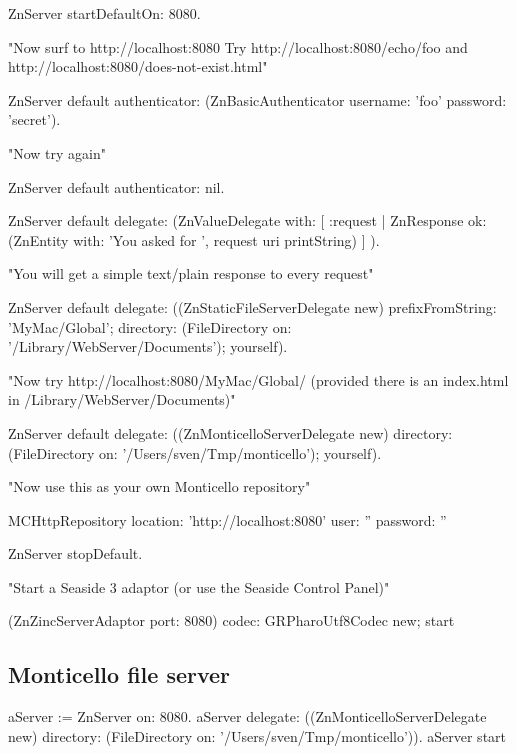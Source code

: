 \documentclass[a4paper,10pt,twoside]{book}
\begin{document}
\begin{code}{}
ZnServer startDefaultOn: 8080. 


"Now surf to http://localhost:8080
 Try http://localhost:8080/echo/foo and http://localhost:8080/does-not-exist.html"


ZnServer default authenticator: (ZnBasicAuthenticator username: 'foo' password: 'secret').


"Now try again"


ZnServer default authenticator: nil.

ZnServer default delegate: 
  (ZnValueDelegate with: [ :request | 
    ZnResponse ok: (ZnEntity with: 'You asked for ', request uri printString) ] ).


"You will get a simple text/plain response to every request"


ZnServer default delegate: ((ZnStaticFileServerDelegate new) 
                               prefixFromString: 'MyMac/Global'; 
                               directory: (FileDirectory on: '/Library/WebServer/Documents'); 
                               yourself).


"Now try http://localhost:8080/MyMac/Global/ 
 (provided there is an index.html in /Library/WebServer/Documents)"


ZnServer default delegate: ((ZnMonticelloServerDelegate new) 
                               directory: (FileDirectory on: '/Users/sven/Tmp/monticello'); 
                               yourself).


"Now use this as your own Monticello repository"


MCHttpRepository
  location: 'http://localhost:8080'
  user: ''
  password: ''

ZnServer stopDefault.


"Start a Seaside 3 adaptor (or use the Seaside Control Panel)"


(ZnZincServerAdaptor port: 8080)
  codec: GRPharoUtf8Codec new;
  start
\end{code}  
  
  
  
\subsection{Monticello file server}
\begin{code}{}
aServer := ZnServer on: 8080.
aServer delegate: ((ZnMonticelloServerDelegate new)
	directory: (FileDirectory on: '/Users/sven/Tmp/monticello')).
aServer start
\end{code}
  
\end{document}
